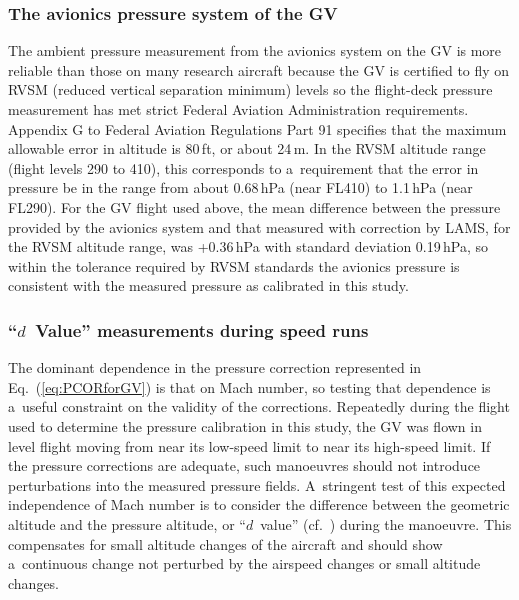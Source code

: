 \documentclass[amtd, online, hvmath]{copernicus}
\begin{document}
\subsubsection{The avionics pressure system of the GV}

The ambient pressure measurement from the avionics system on the GV is
more reliable than those on many research aircraft because the GV is
certified to fly on RVSM (reduced vertical separation minimum) levels
so the flight-deck pressure measurement has met strict Federal
Aviation Administration requirements. Appendix G to Federal Aviation
Regulations Part 91 specifies that the maximum allowable error in
altitude is 80\,ft, or about 24\,m. In the RVSM altitude range (flight
levels 290 to 410), this corresponds to a~requirement that the error
in pressure be in the range from about 0.68\,hPa (near FL410) to
1.1\,hPa (near FL290). For the GV flight used above, the mean
difference between the pressure provided by the avionics system and
that measured with correction by LAMS, for the RVSM altitude range,
was +0.36\,hPa with standard deviation 0.19\,hPa, so within the
tolerance required by RVSM standards the avionics pressure is
consistent with the measured pressure as calibrated in this study.

\subsubsection{``$d$~Value'' measurements during speed runs}

The dominant dependence in the pressure correction represented in
Eq.~(\ref{eq:PCORforGV}) is that on Mach number, so testing that
dependence is a~useful constraint on the validity of the
corrections. Repeatedly during the flight used to determine the
pressure calibration in this study, the GV was flown in level flight
moving from near its low-speed limit to near its high-speed limit. If
the pressure corrections are adequate, such manoeuvres should not
introduce perturbations into the measured pressure fields. A~stringent
test of this expected independence of Mach number is to consider the
difference between the geometric altitude and the pressure altitude,
or ``$d$~value'' (cf.~\citealp{Bellamy1945}) during the manoeuvre.
This compensates for small altitude changes of the aircraft and should
show a~continuous change not perturbed by the airspeed changes or
small altitude changes.
\end{document}
